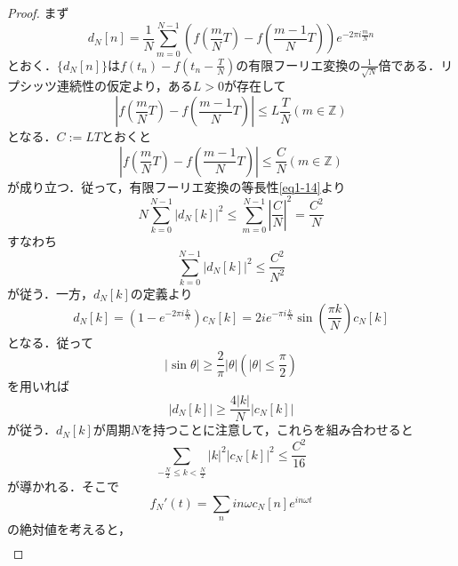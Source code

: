 \documentclass[a4j]{jsbook}
\numberwithin{theorem}{chapter}  %
\begin{document}
\begin{proof}
まず
\begin{equation*}
    d_N[n]=\frac{1}{N}\sum_{m=0}^{N-1}\left(f\left(\frac{m}{N}T\right)-f\left(\frac{m-1}{N}T\right)\right)e^{-2\pi i\frac{m}{N}n}
\end{equation*}
とおく．\(\{d_N[n]\}\)は\(\displaystyle f(t_n)-f\left(t_n-\frac{T}{N}\right)\)の有限フーリエ変換の\(\displaystyle\frac{1}{\sqrt{N}}\)倍である．リプシッツ連続性の仮定より，ある\(L>0\)が存在して
\begin{equation*}
    \left|f\left(\frac{m}{N}T\right)-f\left(\frac{m-1}{N}T\right)\right|\leq L\frac{T}{N} (m\in\mathbb{Z})
\end{equation*}
となる．\(C:=LT\)とおくと
\begin{equation*}
    \left|f\left(\frac{m}{N}T\right)-f\left(\frac{m-1}{N}T\right)\right|\leq \frac{C}{N} (m\in\mathbb{Z})
\end{equation*}
が成り立つ．従って，有限フーリエ変換の等長性\eqref{eq1-14}より
\begin{equation*}
    N\sum_{k=0}^{N-1}\left|d_N[k]\right|^2\leq\sum_{m=0}^{N-1}\left|\frac{C}{N}\right|^2=\frac{C^2}{N}
\end{equation*}
すなわち
\begin{equation*}
    \sum_{k=0}^{N-1}\left|d_N[k]\right|^2\leq\frac{C^2}{N^2}
\end{equation*}
が従う．一方，\(d_N[k]\)の定義より
\begin{equation*}
    d_N[k]=\left(1-e^{-2\pi i\frac{k}{N}}\right)c_N[k]=2ie^{-\pi i\frac{k}{N}}\sin\left(\frac{\pi k}{N}\right)c_N[k]
\end{equation*}
となる．従って
\begin{equation}
    |\sin\theta|\geq\frac{2}{\pi}|\theta| \left(|\theta|\leq\frac{\pi}{2}\right) \label{eq1-16}
\end{equation}
を用いれば
\begin{equation*}
    \left|d_N[k]\right|\geq\frac{4|k|}{N}\left|c_N[k]\right|
\end{equation*}
が従う．\(d_N[k]\)が周期\(N\)を持つことに注意して，これらを組み合わせると
\begin{equation*}
    \sum_{-\frac{N}{2}\leq k<\frac{N}{2}}|k|^2|c_N[k]|^2\leq\frac{C^2}{16}
\end{equation*}
が導かれる．そこで
\begin{equation*}
    f_N'(t)=\sum_{n}in\omega c_N[n]e^{in\omega t}
\end{equation*}
の絶対値を考えると，
\begin{eqnarray}

\end{eqnarray}
\end{proof}
\end{document}
